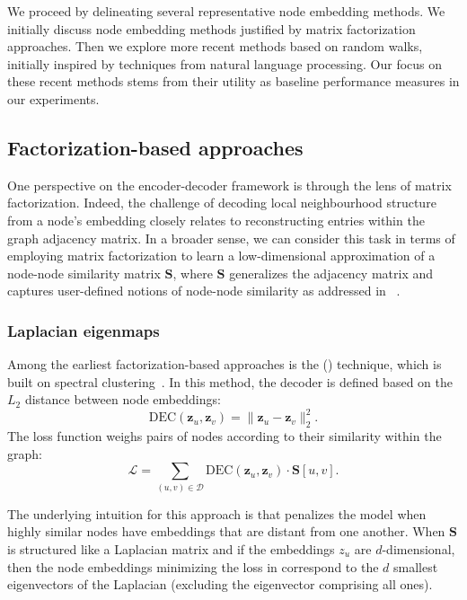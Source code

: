 We proceed by delineating several representative node embedding methods. We initially discuss node embedding methods justified by matrix factorization approaches. Then we explore more recent methods based on random walks, initially inspired by techniques from natural language processing. Our focus on these recent methods stems from their utility as baseline performance measures in our experiments.

\subsection{Factorization-based approaches}\label{sec:factorization}
One perspective on the encoder-decoder framework is through the lens of matrix factorization. Indeed, the challenge of decoding local neighbourhood structure from a node's embedding closely relates to reconstructing entries within the graph adjacency matrix. In a broader sense, we can consider this task in terms of employing matrix factorization to learn a low-dimensional approximation of a node-node similarity matrix $ \mathbf{S} $, where $ \mathbf{S} $ generalizes the adjacency matrix and captures user-defined notions of node-node similarity as addressed in ~\cite{Belkin2001laplacianEigenmapsSpectralClusteringTechniquesEmbeddingClustering}\cite{Kruskal1964MultidimensionalScalingOptimizingGoodnessFitNonmetricHypothesis}.

\subsubsection{Laplacian eigenmaps}
Among the earliest factorization-based approaches is the  () technique, which is built on spectral clustering~\cite{Belkin2001laplacianEigenmapsSpectralClusteringTechniquesEmbeddingClustering}. In this method, the decoder is defined based on the $ L_2 $ distance between node embeddings:
\begin{equation*}
    \text{DEC}(\mathbf{z}_u, \mathbf{z}_v) = \|\mathbf{z}_u - \mathbf{z}_v\|_2^2.
\end{equation*}
The loss function weighs pairs of nodes according to their similarity within the graph:
\begin{equation}\label{eq:laplacianEigenmaploss}
    \mathcal{L} = \sum_{(u,v)\in\mathcal{D}} \text{DEC}(\mathbf{z}_u, \mathbf{z}_v) \cdot \textbf{S}[u,v].
\end{equation}

The underlying intuition for this approach is that  penalizes the model when highly similar nodes have embeddings that are distant from one another. When $ \mathbf{S} $ is structured like a Laplacian matrix and if the embeddings $ z_u $ are $ d $-dimensional, then the node embeddings minimizing the loss in  correspond to the $ d $ smallest eigenvectors of the Laplacian (excluding the eigenvector comprising all ones).

